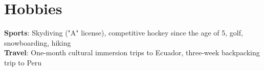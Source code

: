 \documentclass[letterpaper,11pt]{article}
\begin{document}
\section{Hobbies}
  \begin{itemize}[leftmargin=0.15in, label={}]
    \small{\item{
    \textbf{Sports}{: Skydiving ("A" license), competitive hockey since the age of 5, golf, snowboarding, hiking} \\
    \textbf{Travel}{: One-month cultural immersion trips to Ecuador, three-week backpacking trip to Peru} \\
    }}
  \end{itemize}
\end{document}

